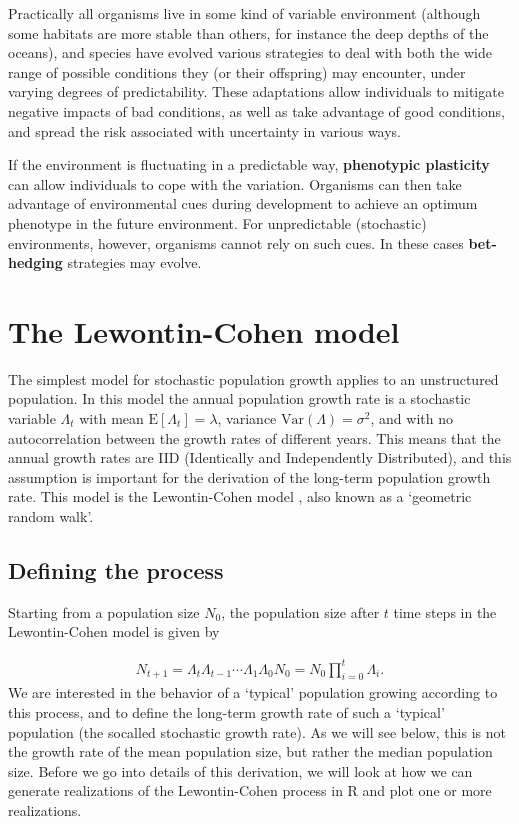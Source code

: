 \documentclass[
]{book}
\begin{document}
Practically all organisms live in some kind of variable environment (although some habitats are more stable than others, for instance the deep depths of the oceans), and species have evolved various strategies to deal with both the wide range of possible conditions they (or their offspring) may encounter, under varying degrees of predictability. These adaptations allow individuals to mitigate negative impacts of bad conditions, as well as take advantage of good conditions, and spread the risk associated with uncertainty in various ways.

If the environment is fluctuating in a predictable way, \textbf{phenotypic plasticity} can allow individuals to cope with the variation. Organisms can then take advantage of environmental cues during development to achieve an optimum phenotype in the future environment. For unpredictable (stochastic) environments, however, organisms cannot rely on such cues. In these cases \textbf{bet-hedging} strategies may evolve.

\hypertarget{the-lewontin-cohen-model}{%
\section{The Lewontin-Cohen model}\label{the-lewontin-cohen-model}}

The simplest model for stochastic population growth applies to an unstructured population. In this model the annual population growth rate is a stochastic variable \(\Lambda_t\) with mean \(\text{E}[\Lambda_t]=\lambda\), variance \(\text{Var}(\Lambda)=\sigma^2\), and with no autocorrelation between the growth rates of different years. This means that the annual growth rates are IID (Identically and Independently Distributed), and this assumption is important for the derivation of the long-term population growth rate. This model is the Lewontin-Cohen model \citep{Lewontin1}, also known as a `geometric random walk'.

\hypertarget{defining-the-process}{%
\subsection{Defining the process}\label{defining-the-process}}

Starting from a population size \(N_0\), the population size after \(t\) time steps in the Lewontin-Cohen model is given by

\begin{align} 
N_{t+1}=\Lambda_{t}\Lambda_{t-1}\cdots\Lambda_{1}\Lambda_0N_0=N_0\prod_{i=0}^t \Lambda_i.
\label{eq:Lewontin1}
\end{align}
We are interested in the behavior of a `typical' population growing according to this process, and to define the long-term growth rate of such a `typical' population (the socalled stochastic growth rate). As we will see below, this is not the growth rate of the mean population size, but rather the median population size. Before we go into details of this derivation, we will look at how we can generate realizations of the Lewontin-Cohen process in R and plot one or more realizations.
\end{document}
